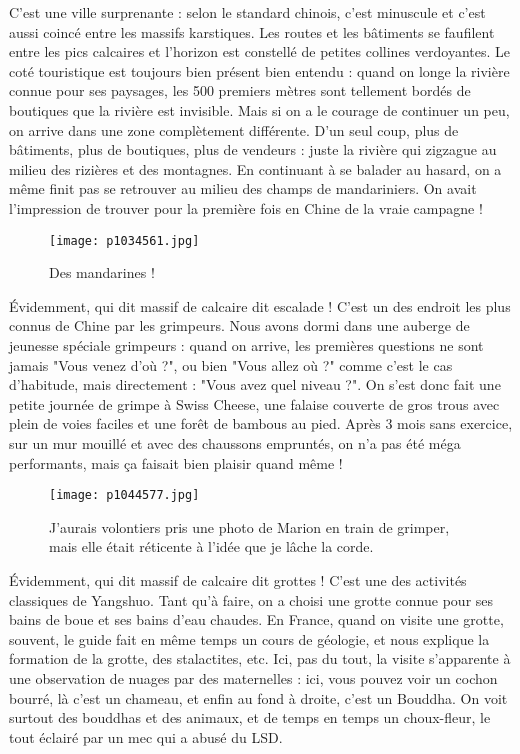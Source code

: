 \documentclass{book}
\begin{document}
C'est une ville surprenante : selon le standard chinois, c'est minuscule et c'est aussi coincé entre les massifs karstiques. Les routes et les bâtiments se faufilent entre les pics calcaires et l'horizon est constellé de petites collines verdoyantes. Le coté touristique est toujours bien présent bien entendu : quand on longe la rivière connue pour ses paysages, les 500 premiers mètres sont tellement bordés de boutiques que la rivière est invisible. Mais si on a le courage de continuer un peu, on arrive dans une zone complètement différente. D'un seul coup, plus de bâtiments, plus de boutiques, plus de vendeurs : juste la rivière qui zigzague au milieu des rizières et des montagnes. En continuant à se balader au hasard, on a même finit pas se retrouver au milieu des champs de mandariniers. On avait l'impression de trouver pour la première fois en Chine de la vraie campagne !


\begin{figure}[h]
\centering
\texttt{[image: p1034561.jpg]}
\caption*{Des mandarines !}
\end{figure}

Évidemment, qui dit massif de calcaire dit escalade ! C'est un des endroit les plus connus de Chine par les grimpeurs. Nous avons dormi dans une auberge de jeunesse spéciale grimpeurs : quand on arrive, les premières questions ne sont jamais "Vous venez d'où ?", ou bien "Vous allez où ?" comme c'est le cas d'habitude, mais directement : "Vous avez quel niveau ?". On s'est donc fait une petite journée de grimpe à Swiss Cheese, une falaise couverte de gros trous avec plein de voies faciles et une forêt de bambous au pied. Après 3 mois sans exercice, sur un mur mouillé et avec des chaussons empruntés, on n'a pas été méga performants, mais ça faisait bien plaisir quand même !


\begin{figure}[h]
\centering
\texttt{[image: p1044577.jpg]}
\caption*{J'aurais volontiers pris une photo de Marion en train de grimper, mais elle était réticente à l'idée que je lâche la corde.}
\end{figure}

Évidemment, qui dit massif de calcaire dit grottes ! C'est une des activités classiques de Yangshuo. Tant qu'à faire, on a choisi une grotte connue pour ses bains de boue et ses bains d'eau chaudes. En France, quand on visite une grotte, souvent, le guide fait en même temps un cours de géologie, et nous explique la formation de la grotte, des stalactites, etc. Ici, pas du tout, la visite s'apparente à une observation de nuages par des maternelles : ici, vous pouvez voir un cochon bourré, là c'est un chameau, et enfin au fond à droite, c'est un Bouddha. On voit surtout des bouddhas et des animaux, et de temps en temps un choux-fleur, le tout éclairé par un mec qui a abusé du LSD.
\end{document}
